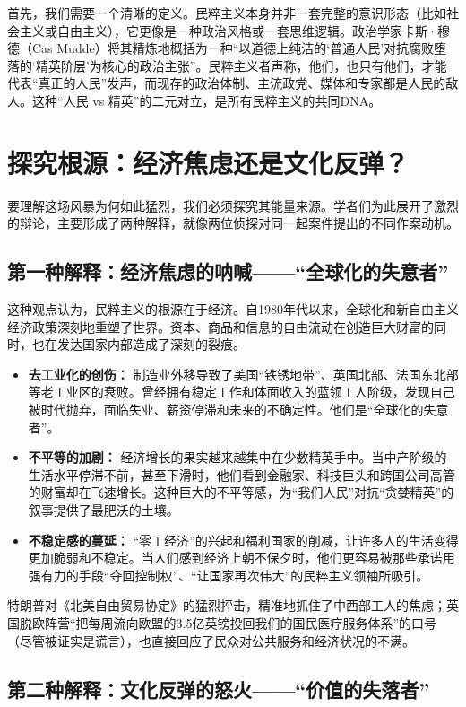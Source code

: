 \documentclass[a5paper, 11pt, openany]{ctexbook}
\begin{document}
首先，我们需要一个清晰的定义。民粹主义本身并非一套完整的意识形态（比如社会主义或自由主义），它更像是一种政治风格或一套思维逻辑。政治学家卡斯·穆德（Cas Mudde）将其精炼地概括为一种“以道德上纯洁的‘普通人民’对抗腐败堕落的‘精英阶层’为核心的政治主张”。民粹主义者声称，他们，也只有他们，才能代表“真正的人民”发声，而现存的政治体制、主流政党、媒体和专家都是人民的敌人。这种“人民 vs 精英”的二元对立，是所有民粹主义的共同DNA。

\section{探究根源：经济焦虑还是文化反弹？}

要理解这场风暴为何如此猛烈，我们必须探究其能量来源。学者们为此展开了激烈的辩论，主要形成了两种解释，就像两位侦探对同一起案件提出的不同作案动机。

\subsection{第一种解释：经济焦虑的呐喊——“全球化的失意者”}

这种观点认为，民粹主义的根源在于经济。自1980年代以来，全球化和新自由主义经济政策深刻地重塑了世界。资本、商品和信息的自由流动在创造巨大财富的同时，也在发达国家内部造成了深刻的裂痕。

\begin{itemize}
    \item \textbf{去工业化的创伤：} 制造业外移导致了美国“铁锈地带”、英国北部、法国东北部等老工业区的衰败。曾经拥有稳定工作和体面收入的蓝领工人阶级，发现自己被时代抛弃，面临失业、薪资停滞和未来的不确定性。他们是“全球化的失意者”。
    \item \textbf{不平等的加剧：} 经济增长的果实越来越集中在少数精英手中。当中产阶级的生活水平停滞不前，甚至下滑时，他们看到金融家、科技巨头和跨国公司高管的财富却在飞速增长。这种巨大的不平等感，为“我们人民”对抗“贪婪精英”的叙事提供了最肥沃的土壤。
    \item \textbf{不稳定感的蔓延：} “零工经济”的兴起和福利国家的削减，让许多人的生活变得更加脆弱和不稳定。当人们感到经济上朝不保夕时，他们更容易被那些承诺用强有力的手段“夺回控制权”、“让国家再次伟大”的民粹主义领袖所吸引。
\end{itemize}

特朗普对《北美自由贸易协定》的猛烈抨击，精准地抓住了中西部工人的焦虑；英国脱欧阵营“把每周流向欧盟的3.5亿英镑投回我们的国民医疗服务体系”的口号（尽管被证实是谎言），也直接回应了民众对公共服务和经济状况的不满。

\subsection{第二种解释：文化反弹的怒火——“价值的失落者”}
\end{document}
